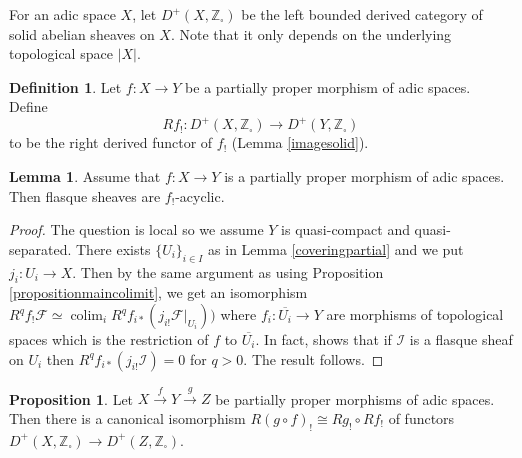 \documentclass{article}
\theoremstyle{definition}
\newtheorem{definition}[theorem]{Definition}
\newtheorem{lemma}[theorem]{Lemma}
\newtheorem{proposition}[theorem]{Proposition}
\def\sF{{\mathscr{F}}}
\def\sI{{\mathscr{I}}}
\def\bZ{{\mathbb Z}}
\DeclareMathOperator{\colim}{colim}
\begin{document}
	For an adic space $X$, let $D^+(X,\bZ_\square)$ be the left bounded derived category of solid abelian sheaves on $X$. Note that it only depends on the underlying topological space $|X|$.

\begin{definition}\label{partialproperpushforward}
	Let $f:X\to Y$ be a partially proper morphism of adic spaces. Define 
	$$Rf_!: D^+(X,\bZ_\square)\to D^+(Y,\bZ_\square)$$
	to be the right derived functor of $f_!$ (Lemma \ref{imagesolid}). 
\end{definition}



\begin{lemma}\label{flasqueacyclic}
		Assume that $f:X\to Y$ is a partially proper morphism of adic spaces. Then flasque sheaves are $f_!$-acyclic.
	\end{lemma}

	\begin{proof}
		 The question is local so we assume $Y$ is quasi-compact and quasi-separated. There exists $\{U_i\}_{i\in I}$ as in Lemma \ref{coveringpartial} and we put $j_i:U_i\to X$. Then by the same argument as \cite[Lemma 4.8(2), 4.9]{abe2020proper} using Proposition \ref{propositionmaincolimit}, we get an isomorphism $R^qf_!\sF\simeq \colim_i R^qf_{i*}(j_{i!}\sF|_{U_i}))$ where $f_i:\overline{U_i}\to Y$ are morphisms of topological spaces which is the restriction of $f$ to $\overline{U_i}$. In fact, \cite[Lemma 4.9]{abe2020proper} shows that if $\sI$ is a flasque sheaf on $U_i$ then $R^qf_{i*}(j_{i!}\sI)=0$ for $q>0$. The result follows.
	\end{proof}
	
	

\begin{proposition}\label{prop:compositionofexceptionalpushforward}
	Let $X\stackrel{f}\longrightarrow Y\stackrel{g}\longrightarrow Z$ be partially proper morphisms of adic spaces. Then there is a canonical isomorphism $R(g\circ f)_!\cong Rg_!\circ Rf_!$ of functors $D^+(X,\bZ_\square)\to D^+(Z,\bZ_\square)$.
\end{proposition}
\end{document}

